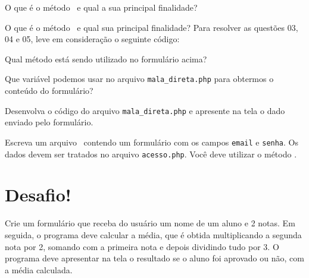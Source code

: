 \begin{description}[labelindent=30pt]
  \item [Q. 01] O que é o método \metodoGET~e qual a sua principal finalidade?
  \item [Q. 02] O que é o método \metodoPOST~e qual sua principal finalidade?
  Para resolver as questões 03, 04 e 05, leve em consideração o seguinte código:
  
  \item [Q. 03] Qual método está sendo utilizado no formulário acima?
  \item [Q. 04] Que variável podemos usar no arquivo \texttt{mala\_direta.php}
  para obtermos o conteúdo do formulário?
  \item [Q. 05] Desenvolva o código do arquivo \texttt{mala\_direta.php} e
  apresente na tela o dado enviado pelo formulário.
  \item [Q. 06] Escreva um arquivo \htmlextensao~contendo um formulário com os
  campos \texttt{email} e \texttt{senha}. Os dados devem ser tratados no arquivo
  \texttt{acesso.php}. Você deve utilizar o método \metodoPOST.
\end{description}

\section{Desafio!}
\label{cap7-desafio}

Crie um formulário que receba do usuário um nome de um aluno e 2 notas. Em seguida, 
o programa deve calcular a média, que é obtida multiplicando a segunda nota por 2, 
somando com a primeira nota e depois dividindo tudo por 3. O programa deve apresentar
na tela o resultado se o aluno foi aprovado ou não, com a média calculada. 